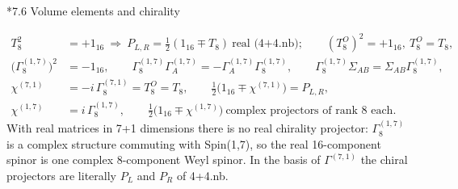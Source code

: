 \documentclass[10pt,a4paper]{article}
\makeatletter
\renewcommand\subsection{\@startsection{subsection}{2}{\z@}{-3.25ex\@plus -1ex \@minus -.2ex}{1.5ex \@plus .2ex}{\normalfont\large\bfseries\raggedright}}
\makeatother
\begin{document}
\subsection*{7.6 Volume elements and chirality}
\begin{align*}
T_8^2&=+1_{16}\ \Rightarrow\ P_{L,R}=\tfrac12(1_{16}\mp T_8)\ \text{real (4+4.nb)};\qquad (T^{O}_8)^2=+1_{16},\ T^{O}_8=T_8, \\
\big(\Gamma^{(1,7)}_8\big)^2&=-1_{16},\qquad \Gamma^{(1,7)}_8\Gamma^{(1,7)}_A=-\Gamma^{(1,7)}_A\Gamma^{(1,7)}_8,\qquad \Gamma^{(1,7)}_8\Sigma_{AB}=\Sigma_{AB}\Gamma^{(1,7)}_8, \\
\chi^{(7,1)}&=-i\,\Gamma^{(7,1)}_8=T^{O}_8=T_8,\qquad \tfrac12\big(1_{16}\mp\chi^{(7,1)}\big)=P_{L,R}, \\
\chi^{(1,7)}&=i\,\Gamma^{(1,7)}_8,\qquad \tfrac12\big(1_{16}\mp\chi^{(1,7)}\big)\ \text{complex projectors of rank 8 each}.
\end{align*}
With real matrices in 7+1 dimensions there is no real chirality projector: $\Gamma^{(1,7)}_8$ is a complex structure commuting with Spin(1,7), so the real 16-component spinor is one complex 8-component Weyl spinor. In the basis of $\Gamma^{(7,1)}$ the chiral projectors are literally $P_L$ and $P_R$ of 4+4.nb.
\end{document}
